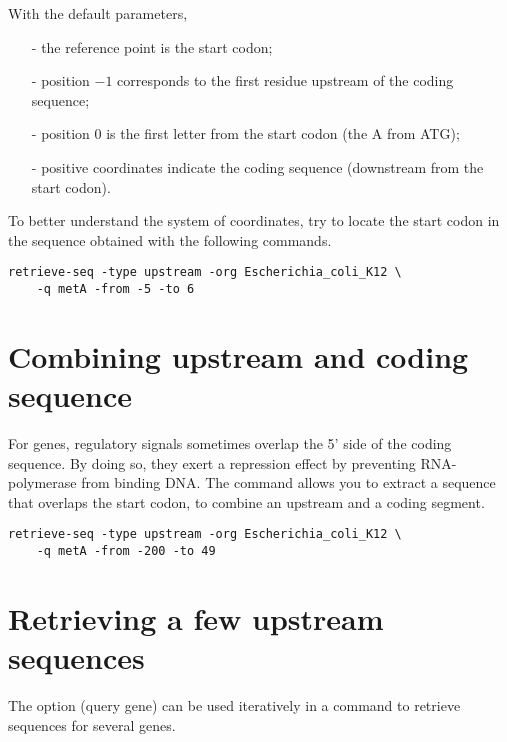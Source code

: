 \begin{samepage}
With the default parameters, 
\begin{itemize}
\item[-] the reference point is the start codon;
\item[-] position $-1$ corresponds to the first residue upstream of
  the coding sequence; 
\item[-] position 0 is the first letter from the start codon (the A from
  ATG);
\item[-] positive coordinates indicate the coding sequence (downstream
  from the start codon).
\end{itemize}
\end{samepage}

To better understand the system of coordinates, try to locate the
start codon in the sequence obtained with the following commands.

{\color{blue} \begin{footnotesize}
\begin{verbatim}
retrieve-seq -type upstream -org Escherichia_coli_K12 \
    -q metA -from -5 -to 6
\end{verbatim} \end{footnotesize}
}


\section{Combining upstream and coding sequence}

For  genes, regulatory signals sometimes overlap the 5'
side of the coding sequence. By doing so, they exert a repression
effect by preventing RNA-polymerase from binding DNA. The command
\program{retrieve-seq} allows you to extract a sequence that overlaps
the start codon, to combine an upstream and a coding segment.

{\color{blue} \begin{footnotesize}
\begin{verbatim}
retrieve-seq -type upstream -org Escherichia_coli_K12 \
    -q metA -from -200 -to 49
\end{verbatim} \end{footnotesize}
}

\section{Retrieving a few upstream sequences}

The option  (query gene) can be used iteratively in a
command to retrieve sequences for several genes.

